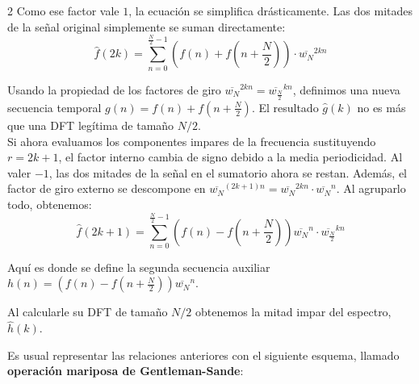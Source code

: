 \documentclass[10pt]{article}
\begin{document}
\begin{multicols}{2}
Como ese factor vale $1$, la ecuación se simplifica drásticamente. Las dos mitades de la señal original simplemente se suman directamente:
\begin{equation}
\widehat{f}(2k) = \sum_{n=0}^{\frac{N}{2}-1} \left( f(n) + f\left(n + \frac{N}{2}\right) \right) \cdot \overline{w_N}^{2kn}
\end{equation}

Usando la propiedad de los factores de giro $\overline{w_N}^{2kn} = \overline{w_{\frac{N}{2}}}^{kn}$, definimos una nueva secuencia temporal $g(n) = f(n) + f\left(n + \frac{N}{2}\right)$. El resultado $\widehat{g}(k)$ no es más que una DFT legítima de tamaño $N/2$.\\
Si ahora evaluamos los componentes impares de la frecuencia sustituyendo $r = 2k + 1$, el factor interno cambia de signo debido a la media periodicidad. Al valer $-1$, las dos mitades de la señal en el sumatorio ahora se restan. Además, el factor de giro externo se descompone en $\overline{w_N}^{(2k+1)n} = \overline{w_N}^{2kn} \cdot \overline{w_N}^n$. Al agruparlo todo, obtenemos:
\begin{equation}
\widehat{f}(2k+1) = \sum_{n=0}^{\frac{N}{2}-1} \left( f(n) - f\left(n + \frac{N}{2}\right) \right) \overline{w_N}^n \cdot \overline{w_{\frac{N}{2}}}^{kn}
\end{equation}

Aquí es donde se define la segunda secuencia auxiliar $h(n) = \left( f(n) - f\left(n + \frac{N}{2}\right) \right) \overline{w_N}^n$. 

Al calcularle su DFT de tamaño $N/2$ obtenemos la mitad impar del espectro, $\widehat{h}(k)$.

Es usual representar las relaciones anteriores con el siguiente esquema, llamado \textbf{operación mariposa de Gentleman-Sande}:

\begin{center}
\end{center}
\end{multicols}
\end{document}
